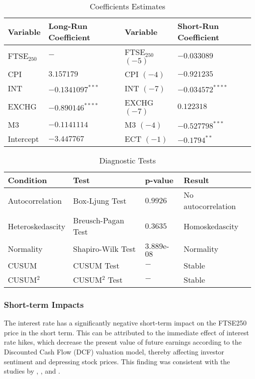 \documentclass[11pt,a4paper]{article}
\newcommand{\citeboth}[1]{\citeauthor{#1} \citep{#1}}
\begin{document}
\begin{table}[h!]
    \centering
    \caption{Coefficients Estimates}
    \begin{tabular}{llll}
        \toprule
        \textbf{Variable} & \textbf{Long-Run Coefficient} & \textbf{Variable} & \textbf{Short-Run Coefficient} \\
        \midrule
        FTSE$_{250}$ & $-$ & FTSE$_{250}$ $(-5)$  & $-0.033089$ \\
        CPI & $3.157179$ & CPI $(-4)$ & $-0.921235$ \\
        INT & $-0.1341097^{***}$ & INT $(-7)$ & $-0.034572^{****}$\\
        EXCHG &  $-0.890146^{****}$ & EXCHG $(-7)$ & $0.122318$ \\
        M3 & $-0.1141114$ & M3 $(-4)$ & $-0.527798^{***}$ \\
        Intercept & $-3.447767$ & ECT $(-1)$ & $-0.1794^{**}$ \\
        \bottomrule
    \end{tabular}
\end{table}

\begin{table}[h!]
    \centering
    \caption{Diagnostic Tests}
    \begin{tabular}{llll}
        \toprule
        \textbf{Condition} & \textbf{Test} & \textbf{p-value} & \textbf{Result} \\
        \midrule
        Autocorrelation & Box-Ljung Test & $0.9926$ & No autocorrelation \\
        Heteroskedascity & Breusch-Pagan Test & $0.3635$ & Homoskedascity \\
        Normality & Shapiro-Wilk Test & $3.889$e-$08$ & Normality \\
        CUSUM & CUSUM Test & $-$ & Stable \\
        CUSUM$^2$ & CUSUM$^2$ Test & $-$ & Stable \\
        \bottomrule
    \end{tabular}
\end{table}

\subsubsection{Short-term Impacts}

The interest rate has a significantly
negative short-term impact on the FTSE250 price in the short term. 
This can be attributed to the immediate effect of interest rate hikes, 
which decrease the present value of future earnings according to the 
Discounted Cash Flow (DCF) valuation model, thereby 
affecting investor sentiment and depressing stock prices. 
This finding was consistent with the studies by 
\citeboth{alam2009}, \citeboth{demir2019}, and \citeboth{neifar2023}.
\end{document}
